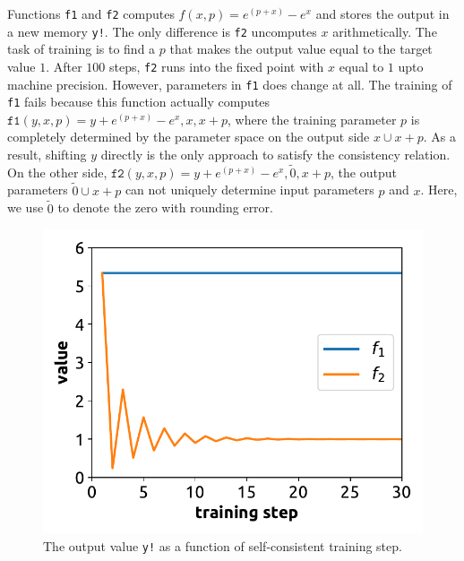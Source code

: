 \documentclass[aps,twocolumn,longbibliography,english,superscriptaddress]{revtex4-1}
\newcommand{\<}{\langle}
\renewcommand{\>}{\rangle}
\theoremstyle{definition}\newtheorem{definition}{\textit{Definition}}
\begin{document}
Functions \texttt{f1} and \texttt{f2} computes $f(x, p) = e^{(p+x)} - e^x$ and stores the output in a new memory \texttt{y!}.
The only difference is \texttt{f2} uncomputes $x$ arithmetically.
The task of training is to find a $p$ that makes the output value equal to the target value $1$.
After $100$ steps, \texttt{f2} runs into the fixed point with $x$ equal to $1$ upto machine precision.
However, parameters in \texttt{f1} does change at all.
The training of \texttt{f1} fails because this function actually computes $\texttt{f1}(y, x, p) = y + e^{(p+x)} - e^{x}, x, x+p$, where the training parameter $p$ is completely determined by the parameter space on the output side $x \cup x+p$. As a result, shifting $y$ directly is the only approach to satisfy the consistency relation. On the other side, $\texttt{f2}(y, x, p) = y + e^{(p+x)} - e^x, \tilde{0}, x+p$, the output parameters $\tilde{0} \cup x+p$ can not uniquely determine input parameters $p$ and $x$. Here, we use $\tilde{0}$ to denote the zero with rounding error.

\begin{figure}
    \centerline{\includegraphics[width=0.9\columnwidth,trim={0 0.3cm 0 0},clip]{images/fig1.pdf}}
    \caption{The output value \texttt{y!} as a function of self-consistent training step.}\label{fig:invtrain}
\end{figure}
\end{document}
